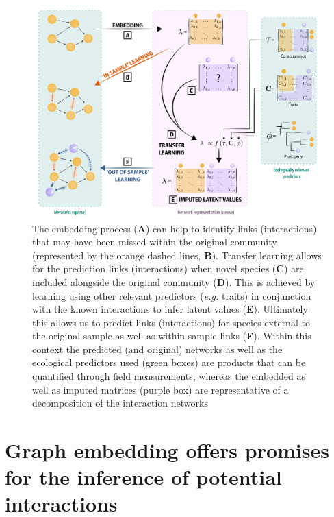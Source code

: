 \documentclass[11pt]{article}
\makeatletter
\def\maxwidth{\ifdim\Gin@nat@width>\linewidth\linewidth
\else\Gin@nat@width\fi}
\let\Oldincludegraphics\includegraphics
\renewcommand{\includegraphics}[1]{\Oldincludegraphics[width=\maxwidth]{#1}}
\makeatother
\begin{document}
\begin{figure}
\hypertarget{fig:embedding}{%
\centering
\includegraphics{figures/conceptual_2.png}
\caption{The embedding process (\textbf{A}) can help to identify links
(interactions) that may have been missed within the original community
(represented by the orange dashed lines, \textbf{B}). Transfer learning
allows for the prediction links (interactions) when novel species
(\textbf{C}) are included alongside the original community (\textbf{D}).
This is achieved by learning using other relevant predictors
(\emph{e.g.} traits) in conjunction with the known interactions to infer
latent values (\textbf{E}). Ultimately this allows us to predict links
(interactions) for species external to the original sample as well as
within sample links (\textbf{F}). Within this context the predicted (and
original) networks as well as the ecological predictors used (green
boxes) are products that can be quantified through field measurements,
whereas the embedded as well as imputed matrices (purple box) are
representative of a decomposition of the interaction
networks}\label{fig:embedding}
}
\end{figure}

\hypertarget{graph-embedding-offers-promises-for-the-inference-of-potential-interactions}{%
\section{Graph embedding offers promises for the inference of potential
interactions}\label{graph-embedding-offers-promises-for-the-inference-of-potential-interactions}}
\end{document}
